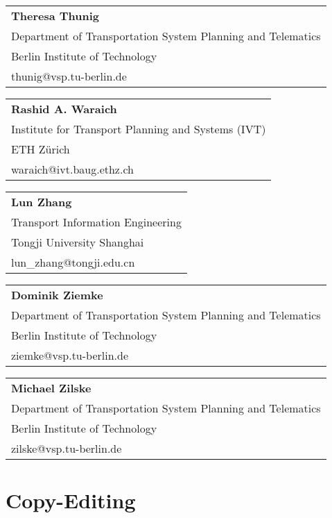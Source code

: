 \begin{tabular}[width=0.48\textwidth]{l}
\textbf{Theresa Thunig} \\
Department of Transportation System Planning and Telematics \\
Berlin Institute of Technology \\
thunig@vsp.tu-berlin.de \\
\end{tabular}

\begin{tabular}[width=0.48\textwidth]{l}
\textbf{Rashid A. Waraich} \\
Institute for Transport Planning and Systems (IVT) \\
ETH Zürich \\
waraich@ivt.baug.ethz.ch \\
\end{tabular}

\begin{tabular}[width=0.48\textwidth]{l}
\textbf{Lun Zhang} \\
Transport Information Engineering \\
Tongji University Shanghai \\
lun\_zhang@tongji.edu.cn \\
\end{tabular}

\begin{tabular}[width=0.48\textwidth]{l}
\textbf{Dominik Ziemke} \\
Department of Transportation System Planning and Telematics \\
Berlin Institute of Technology \\
ziemke@vsp.tu-berlin.de \\
\end{tabular}

\begin{tabular}[width=0.48\textwidth]{l}
\textbf{Michael Zilske} \\
Department of Transportation System Planning and Telematics \\
Berlin Institute of Technology \\
zilske@vsp.tu-berlin.de \\
\end{tabular}

\section*{Copy-Editing}

